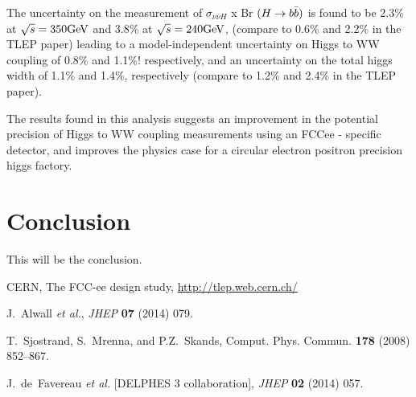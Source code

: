 \documentclass[preprintnumbers,nofootinbib,noshowpacs,eqsecnum,prd,superscriptaddress,letterpaper]{revtex4}
\begin{document}
The uncertainty on the measurement of  $\sigma_{\nu\bar{\nu}H}$ x Br $(H \rightarrow b\bar{b})$ is found to be 2.3\% at $\sqrt{s} = 350 \text{GeV}$ and 3.8\% at $\sqrt{s} = 240 \text{GeV}$, (compare to 0.6\% and 2.2\% in the TLEP paper) leading to a model-independent uncertainty on Higgs to WW coupling of 0.8\% and 1.1\%! respectively, and an uncertainty on the total higgs width of 1.1\% and 1.4\%, respectively (compare to 1.2\% and 2.4\% in the TLEP paper).

The results found in this analysis suggests an improvement in the potential precision of Higgs to WW coupling measurements using an FCCee - specific detector, and improves the physics case for a circular electron positron precision higgs factory. 

\section{Conclusion}
\label{sec:conclusion}


This will be the conclusion.

\clearpage

\begin{thebibliography}{99}

   CERN, The FCC-ee design study, \url{http://tlep.web.cern.ch/}
  
   J.~Alwall {\it et al.},
   {\it JHEP} {\bf 07} (2014) 079.
  
   T.~Sjostrand, S.~Mrenna, and P.Z.~Skands,
   Comput. Phys. Commun. {\bf 178} (2008) 852–867.
 
   J.~de~Favereau {\it et al.} [DELPHES 3 collaboration],
   {\it JHEP} {\bf 02} (2014) 057.
  

\end{thebibliography}
\end{document}

